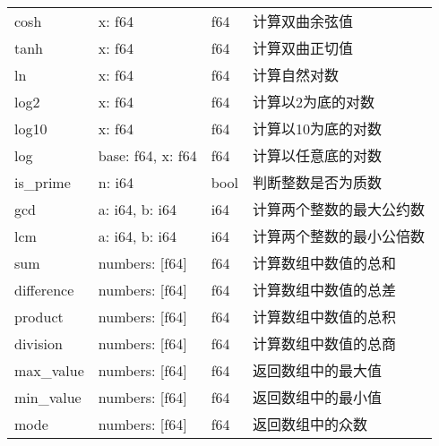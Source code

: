 \begin{longtable}[c]{@{}llll@{}}
    cosh               & x: f64                                                 & f64         & 计算双曲余弦值        \\
    tanh               & x: f64                                                 & f64         & 计算双曲正切值        \\
    ln                 & x: f64                                                 & f64         & 计算自然对数         \\
    log2               & x: f64                                                 & f64         & 计算以2为底的对数      \\
    log10              & x: f64                                                 & f64         & 计算以10为底的对数     \\
    log                & base: f64, x: f64                                      & f64         & 计算以任意底的对数      \\
    is\_prime          & n: i64                                                 & bool        & 判断整数是否为质数      \\
    gcd                & a: i64, b: i64                                         & i64         & 计算两个整数的最大公约数   \\
    lcm                & a: i64, b: i64                                         & i64         & 计算两个整数的最小公倍数   \\
    sum                & numbers: [f64]                                         & f64         & 计算数组中数值的总和     \\
    difference         & numbers: [f64]                                         & f64         & 计算数组中数值的总差     \\
    product            & numbers: [f64]                                         & f64         & 计算数组中数值的总积     \\
    division           & numbers: [f64]                                         & f64         & 计算数组中数值的总商     \\
    max\_value         & numbers: [f64]                                         & f64         & 返回数组中的最大值      \\
    min\_value         & numbers: [f64]                                         & f64         & 返回数组中的最小值      \\
    mode               & numbers: [f64]                                         & f64         & 返回数组中的众数       \\

\end{longtable}
